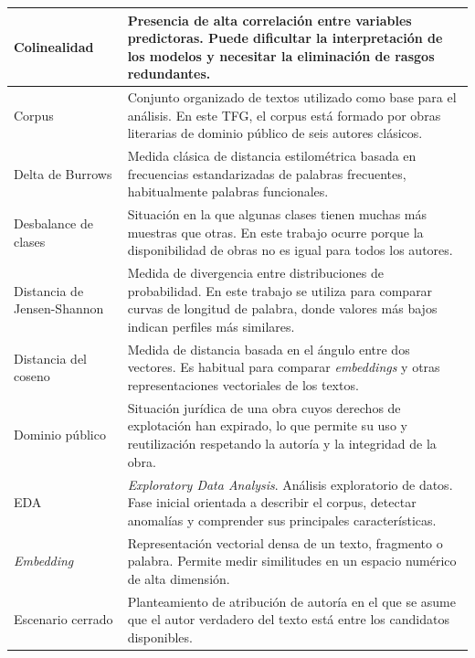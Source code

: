 \documentclass[IB]{TFUOC}%
\begin{document}
\begin{longtable}{|p{5.2cm}|p{10.5cm}|}
Colinealidad &
Presencia de alta correlación entre variables predictoras. Puede dificultar la interpretación de los modelos y necesitar la eliminación de rasgos redundantes. \\
\hline

Corpus &
Conjunto organizado de textos utilizado como base para el análisis. En este TFG, el corpus está formado por obras literarias de dominio público de seis autores clásicos. \\
\hline

Delta de Burrows &
Medida clásica de distancia estilométrica basada en frecuencias estandarizadas de palabras frecuentes, habitualmente palabras funcionales. \\
\hline

Desbalance de clases &
Situación en la que algunas clases tienen muchas más muestras que otras. En este trabajo ocurre porque la disponibilidad de obras no es igual para todos los autores. \\
\hline

Distancia de Jensen-Shannon &
Medida de divergencia entre distribuciones de probabilidad. En este trabajo se utiliza para comparar curvas de longitud de palabra, donde valores más bajos indican perfiles más similares. \\
\hline

Distancia del coseno &
Medida de distancia basada en el ángulo entre dos vectores. Es habitual para comparar \textit{embeddings} y otras representaciones vectoriales de los textos. \\
\hline

Dominio público &
Situación jurídica de una obra cuyos derechos de explotación han expirado, lo que permite su uso y reutilización respetando la autoría y la integridad de la obra. \\
\hline

EDA &
\textit{Exploratory Data Analysis}. Análisis exploratorio de datos. Fase inicial orientada a describir el corpus, detectar anomalías y comprender sus principales características. \\
\hline

\textit{Embedding} &
Representación vectorial densa de un texto, fragmento o palabra. Permite medir similitudes en un espacio numérico de alta dimensión. \\
\hline

Escenario cerrado &
Planteamiento de atribución de autoría en el que se asume que el autor verdadero del texto está entre los candidatos disponibles. \\
\hline


\end{longtable}
\end{document}
